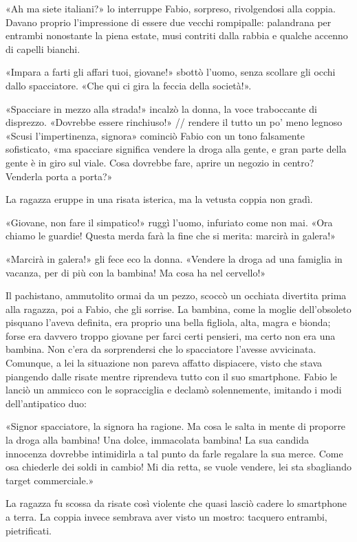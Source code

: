 «Ah ma siete italiani?» lo interruppe Fabio, sorpreso, rivolgendosi alla coppia. Davano proprio l'impressione di essere due vecchi rompipalle: palandrana per entrambi nonostante la piena estate, musi contriti dalla rabbia e qualche accenno di capelli bianchi.

«Impara a farti gli affari tuoi, giovane!» sbottò l'uomo, senza scollare gli occhi dallo spacciatore. «Che qui ci gira la feccia della società!».

«Spacciare in mezzo alla strada!» incalzò la donna, la voce traboccante di disprezzo. «Dovrebbe essere rinchiuso!»
// rendere il tutto un po' meno legnoso
«Scusi l'impertinenza, signora» cominciò Fabio con un tono falsamente sofisticato, «ma spacciare significa vendere la droga alla gente, e gran parte della gente è in giro sul viale. Cosa dovrebbe fare, aprire un negozio in centro? Venderla porta a porta?»

La ragazza eruppe in una risata isterica, ma la vetusta coppia non gradì.

«Giovane, non fare il simpatico!» ruggì l'uomo, infuriato come non mai. «Ora chiamo le guardie! Questa merda farà la fine che si merita: marcirà in galera!»

«Marcirà in galera!» gli fece eco la donna. «Vendere la droga ad una famiglia in vacanza, per di più con la bambina! Ma cosa ha nel cervello!»

Il pachistano, ammutolito ormai da un pezzo, scoccò un occhiata divertita prima alla ragazza, poi a Fabio, che gli sorrise. La bambina, come la moglie dell'obsoleto pisquano l'aveva definita, era proprio una bella figliola, alta, magra e bionda; forse era davvero troppo giovane per farci certi pensieri, ma certo non era una bambina. Non c'era da sorprendersi che lo spacciatore l'avesse avvicinata. Comunque, a lei la situazione non pareva affatto dispiacere, visto che stava piangendo dalle risate mentre riprendeva tutto con il suo smartphone. Fabio le lanciò un ammicco con le sopracciglia e declamò solennemente, imitando i modi dell'antipatico duo:

«Signor spacciatore, la signora ha ragione. Ma cosa le salta in mente di proporre la droga alla bambina! Una dolce, immacolata bambina! La sua candida innocenza dovrebbe intimidirla a tal punto da farle regalare la sua merce. Come osa chiederle dei soldi in cambio! Mi dia retta, se vuole vendere, lei sta sbagliando target commerciale.»

La ragazza fu scossa da risate così violente che quasi lasciò cadere lo smartphone a terra. La coppia invece sembrava aver visto un mostro: tacquero entrambi, pietrificati.

